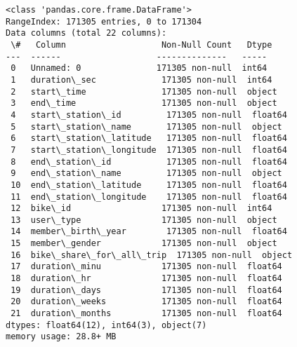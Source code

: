 \documentclass[11pt]{article}
\begin{document}
    \begin{Verbatim}[commandchars=\\\{\}]
<class 'pandas.core.frame.DataFrame'>
RangeIndex: 171305 entries, 0 to 171304
Data columns (total 22 columns):
 \#   Column                   Non-Null Count   Dtype
---  ------                   --------------   -----
 0   Unnamed: 0               171305 non-null  int64
 1   duration\_sec             171305 non-null  int64
 2   start\_time               171305 non-null  object
 3   end\_time                 171305 non-null  object
 4   start\_station\_id         171305 non-null  float64
 5   start\_station\_name       171305 non-null  object
 6   start\_station\_latitude   171305 non-null  float64
 7   start\_station\_longitude  171305 non-null  float64
 8   end\_station\_id           171305 non-null  float64
 9   end\_station\_name         171305 non-null  object
 10  end\_station\_latitude     171305 non-null  float64
 11  end\_station\_longitude    171305 non-null  float64
 12  bike\_id                  171305 non-null  int64
 13  user\_type                171305 non-null  object
 14  member\_birth\_year        171305 non-null  float64
 15  member\_gender            171305 non-null  object
 16  bike\_share\_for\_all\_trip  171305 non-null  object
 17  duration\_minu            171305 non-null  float64
 18  duration\_hr              171305 non-null  float64
 19  duration\_days            171305 non-null  float64
 20  duration\_weeks           171305 non-null  float64
 21  duration\_months          171305 non-null  float64
dtypes: float64(12), int64(3), object(7)
memory usage: 28.8+ MB
    \end{Verbatim}
\end{document}
